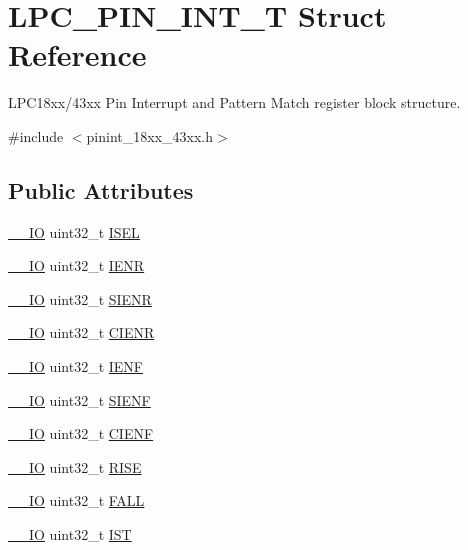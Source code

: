 \hypertarget{struct_l_p_c___p_i_n___i_n_t___t}{}\section{L\+P\+C\+\_\+\+P\+I\+N\+\_\+\+I\+N\+T\+\_\+T Struct Reference}
\label{struct_l_p_c___p_i_n___i_n_t___t}


L\+P\+C18xx/43xx Pin Interrupt and Pattern Match register block structure.  




{\ttfamily \#include $<$pinint\+\_\+18xx\+\_\+43xx.\+h$>$}

\subsection*{Public Attributes}
\begin{DoxyCompactItemize}
\item 
\hyperlink{core__sc300_8h_aec43007d9998a0a0e01faede4133d6be}{\+\_\+\+\_\+\+IO} uint32\+\_\+t \hyperlink{struct_l_p_c___p_i_n___i_n_t___t_a131b5900d6103825d8580c1893d80fb8}{I\+S\+EL}
\item 
\hyperlink{core__sc300_8h_aec43007d9998a0a0e01faede4133d6be}{\+\_\+\+\_\+\+IO} uint32\+\_\+t \hyperlink{struct_l_p_c___p_i_n___i_n_t___t_a7e61100f418f7e52168858d5f73a9c2c}{I\+E\+NR}
\item 
\hyperlink{core__sc300_8h_aec43007d9998a0a0e01faede4133d6be}{\+\_\+\+\_\+\+IO} uint32\+\_\+t \hyperlink{struct_l_p_c___p_i_n___i_n_t___t_ac235fcb090dfebc8b96e116c7608e1a3}{S\+I\+E\+NR}
\item 
\hyperlink{core__sc300_8h_aec43007d9998a0a0e01faede4133d6be}{\+\_\+\+\_\+\+IO} uint32\+\_\+t \hyperlink{struct_l_p_c___p_i_n___i_n_t___t_ac54c5a5a0ca24c4db057500cba9fd8df}{C\+I\+E\+NR}
\item 
\hyperlink{core__sc300_8h_aec43007d9998a0a0e01faede4133d6be}{\+\_\+\+\_\+\+IO} uint32\+\_\+t \hyperlink{struct_l_p_c___p_i_n___i_n_t___t_a08455782419bcc978d6431c2ac14344c}{I\+E\+NF}
\item 
\hyperlink{core__sc300_8h_aec43007d9998a0a0e01faede4133d6be}{\+\_\+\+\_\+\+IO} uint32\+\_\+t \hyperlink{struct_l_p_c___p_i_n___i_n_t___t_ad5548753b926e10016b82652baa0e82b}{S\+I\+E\+NF}
\item 
\hyperlink{core__sc300_8h_aec43007d9998a0a0e01faede4133d6be}{\+\_\+\+\_\+\+IO} uint32\+\_\+t \hyperlink{struct_l_p_c___p_i_n___i_n_t___t_a6b67da80694013d6e67b935e43027d3f}{C\+I\+E\+NF}
\item 
\hyperlink{core__sc300_8h_aec43007d9998a0a0e01faede4133d6be}{\+\_\+\+\_\+\+IO} uint32\+\_\+t \hyperlink{struct_l_p_c___p_i_n___i_n_t___t_ab4d8747e5395ce59f057efdc93fb5020}{R\+I\+SE}
\item 
\hyperlink{core__sc300_8h_aec43007d9998a0a0e01faede4133d6be}{\+\_\+\+\_\+\+IO} uint32\+\_\+t \hyperlink{struct_l_p_c___p_i_n___i_n_t___t_a0a636a94b44042ec47f27ddcc1ac6584}{F\+A\+LL}
\item 
\hyperlink{core__sc300_8h_aec43007d9998a0a0e01faede4133d6be}{\+\_\+\+\_\+\+IO} uint32\+\_\+t \hyperlink{struct_l_p_c___p_i_n___i_n_t___t_a67b3bdefe49f13180b2cd84d237de3ff}{I\+ST}
\end{DoxyCompactItemize}


